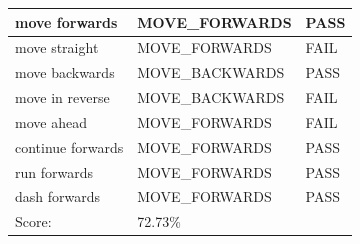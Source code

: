 \documentclass[11pt]{article}
\begin{document}
\begin{appendices}
\begin{table}[H]
\begin{tabular}{lll}
\multicolumn{1}{l|}{move forwards}                  & \multicolumn{1}{l|}{MOVE\_FORWARDS}     & \cellcolor[HTML]{67FD9A}PASS \\ \hline
\multicolumn{1}{l|}{move straight}                  & \multicolumn{1}{l|}{MOVE\_FORWARDS}     & \cellcolor[HTML]{FD6864}FAIL \\ \hline
\multicolumn{1}{l|}{move backwards}                 & \multicolumn{1}{l|}{MOVE\_BACKWARDS}    & \cellcolor[HTML]{67FD9A}PASS \\ \hline
\multicolumn{1}{l|}{move in reverse}                & \multicolumn{1}{l|}{MOVE\_BACKWARDS}    & \cellcolor[HTML]{FD6864}FAIL \\ \hline
\multicolumn{1}{l|}{move ahead}                     & \multicolumn{1}{l|}{MOVE\_FORWARDS}     & \cellcolor[HTML]{FD6864}FAIL \\ \hline
\multicolumn{1}{l|}{continue forwards}              & \multicolumn{1}{l|}{MOVE\_FORWARDS}     & \cellcolor[HTML]{67FD9A}PASS \\ \hline
\multicolumn{1}{l|}{run forwards}                   & \multicolumn{1}{l|}{MOVE\_FORWARDS}     & \cellcolor[HTML]{67FD9A}PASS \\ \hline
\multicolumn{1}{l|}{dash forwards}                  & \multicolumn{1}{l|}{MOVE\_FORWARDS}     & \cellcolor[HTML]{67FD9A}PASS \\ \hline
\multicolumn{1}{l|}{Score:}                         & \multicolumn{1}{l|}{72.73\%}            &                              \\
\end{tabular}
\end{table}


\end{appendices}
\end{document}
